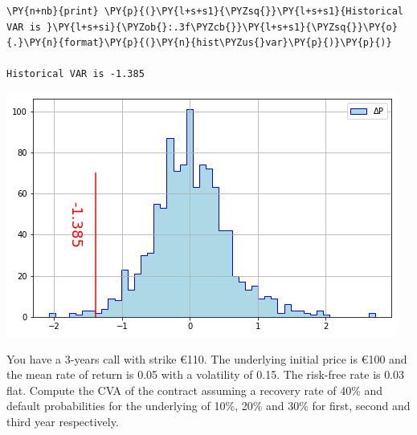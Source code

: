 \begin{Answer}
\begin{codebox}[size=fbox, boxrule=1pt, colback=cellbackground, colframe=cellborder]
\begin{Verbatim}[commandchars=\\\{\}]
\PY{n+nb}{print} \PY{p}{(}\PY{l+s+s1}{\PYZsq{}}\PY{l+s+s1}{Historical VAR is }\PY{l+s+si}{\PYZob{}:.3f\PYZcb{}}\PY{l+s+s1}{\PYZsq{}}\PY{o}{.}\PY{n}{format}\PY{p}{(}\PY{n}{hist\PYZus{}var}\PY{p}{)}\PY{p}{)}

Historical VAR is -1.385
\end{Verbatim}
\end{codebox}

\includegraphics{figures/hist_var_ex}
\end{Answer}

\begin{Exercise}[title={(Credit Valuation Adjustment)}]
You have a 3-years call with strike \euro{110}. The underlying initial price is \euro{100} and the mean rate of return is 0.05 with a volatility of 0.15. The risk-free rate is 0.03 flat.
Compute the CVA of the contract assuming a recovery rate of 40\% and default probabilities for the underlying of 10\%, 20\% and 30\% for first, second and third year respectively.
\end{Exercise}

